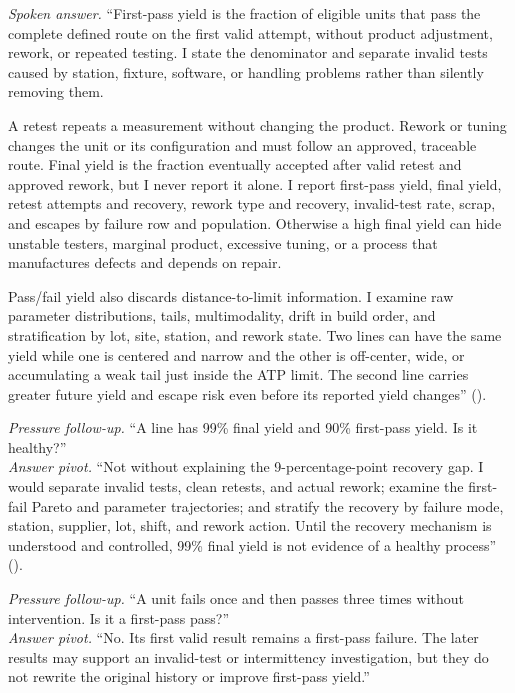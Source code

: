 \textit{Spoken answer.}
``First-pass yield is the fraction of eligible units that pass the complete
defined route on the first valid attempt, without product adjustment, rework,
or repeated testing. I state the denominator and separate invalid tests caused
by station, fixture, software, or handling problems rather than silently
removing them.

A retest repeats a measurement without changing the product. Rework or tuning
changes the unit or its configuration and must follow an approved, traceable
route. Final yield is the fraction eventually accepted after valid retest and
approved rework, but I never report it alone. I report first-pass yield, final
yield, retest attempts and recovery, rework type and recovery, invalid-test
rate, scrap, and escapes by failure row and population. Otherwise a high final
yield can hide unstable testers, marginal product, excessive tuning, or a
process that manufactures defects and depends on repair.

Pass/fail yield also discards distance-to-limit information. I examine raw
parameter distributions, tails, multimodality, drift in build order, and
stratification by lot, site, station, and rework state. Two lines can have the
same yield while one is centered and narrow and the other is off-center, wide,
or accumulating a weak tail just inside the ATP limit. The second line carries
greater future yield and escape risk even before its reported yield changes''
().

\textit{Pressure follow-up.} ``A line has 99\% final yield and 90\% first-pass
yield. Is it healthy?''\\
\textit{Answer pivot.} ``Not without explaining the 9-percentage-point recovery
gap. I would separate invalid tests, clean retests, and actual rework; examine
the first-fail Pareto and parameter trajectories; and stratify the recovery by
failure mode, station, supplier, lot, shift, and rework action. Until the
recovery mechanism is understood and controlled, 99\% final yield is not
evidence of a healthy process''
().

\textit{Pressure follow-up.} ``A unit fails once and then passes three times
without intervention. Is it a first-pass pass?''\\
\textit{Answer pivot.} ``No. Its first valid result remains a first-pass
failure. The later results may support an invalid-test or intermittency
investigation, but they do not rewrite the original history or improve
first-pass yield.''

